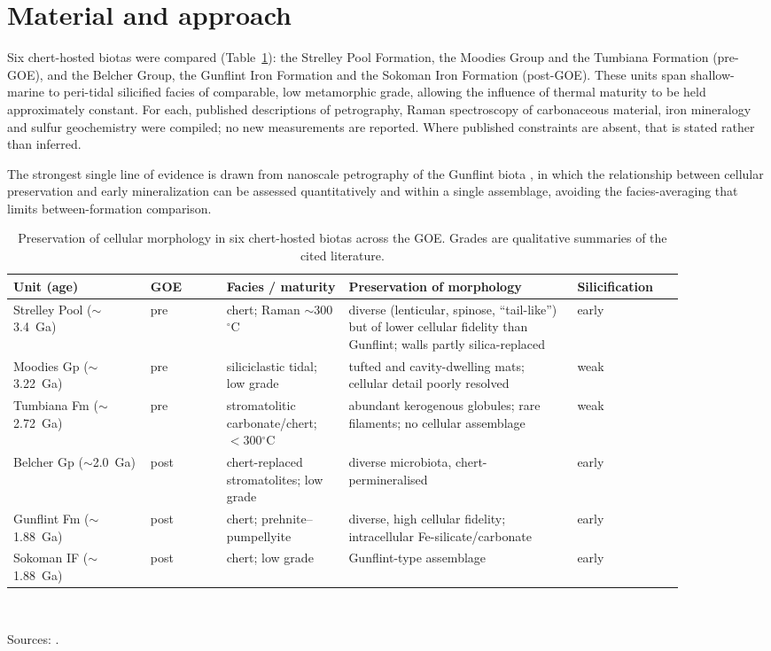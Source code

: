 \documentclass[11pt]{article}
\begin{document}
\section{Material and approach}

Six chert-hosted biotas were compared (Table~\ref{tab:panel}): the Strelley Pool Formation, the
Moodies Group and the Tumbiana Formation (pre-GOE), and the Belcher Group, the Gunflint Iron
Formation and the Sokoman Iron Formation (post-GOE). These units span shallow-marine to
peri-tidal silicified facies of comparable, low metamorphic grade, allowing the influence of
thermal maturity to be held approximately constant. For each, published descriptions of petrography,
Raman spectroscopy of carbonaceous material, iron mineralogy and sulfur geochemistry were compiled;
no new measurements are reported. Where published constraints are absent, that is stated rather than
inferred.

The strongest single line of evidence is drawn from nanoscale petrography of the Gunflint biota
\citep{Lepot2017}, in which the relationship between cellular preservation and early mineralization
can be assessed quantitatively and within a single assemblage, avoiding the facies-averaging that
limits between-formation comparison.

\begin{table}[t]
\centering\small
\caption{Preservation of cellular morphology in six chert-hosted biotas across the GOE. Grades are
qualitative summaries of the cited literature.}
\label{tab:panel}
\begin{tabular}{p{0.18\linewidth}p{0.10\linewidth}p{0.16\linewidth}p{0.30\linewidth}p{0.14\linewidth}}
\toprule
Unit (age) & GOE & Facies / maturity & Preservation of morphology & Silicification \\
\midrule
Strelley Pool ($\sim$3.4~Ga) & pre & chert; Raman $\sim$300$^\circ$C & diverse (lenticular, spinose, ``tail-like'') but of lower cellular fidelity than Gunflint; walls partly silica-replaced & early \\
Moodies Gp ($\sim$3.22~Ga) & pre & siliciclastic tidal; low grade & tufted and cavity-dwelling mats; cellular detail poorly resolved & weak \\
Tumbiana Fm ($\sim$2.72~Ga) & pre & stromatolitic carbonate/chert; $<$300$^\circ$C & abundant kerogenous globules; rare filaments; no cellular assemblage & weak \\
\midrule
Belcher Gp ($\sim$2.0~Ga) & post & chert-replaced stromatolites; low grade & diverse microbiota, chert-permineralised & early \\
Gunflint Fm ($\sim$1.88~Ga) & post & chert; prehnite--pumpellyite & diverse, high cellular fidelity; intracellular Fe-silicate/carbonate & early \\
Sokoman IF ($\sim$1.88~Ga) & post & chert; low grade & Gunflint-type assemblage & early \\
\bottomrule
\end{tabular}
\\[2pt]
\raggedright\footnotesize Sources: \citep{Sugitani2010,Delarue2020,Wacey2012,Homann2015,Lepot2009,%
Decreane2021,Lepot2017,Wacey2013,Alleon2016,Javaux2018}.
\end{table}
\end{document}
